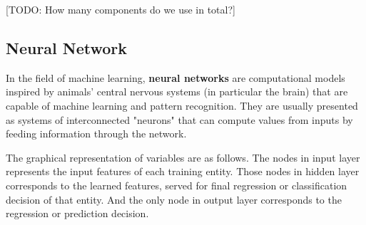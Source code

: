 \documentclass{article} %
\begin{document}
{\large [TODO: How many components do we use in total?]}


\subsection{Neural Network}
In the field of machine learning, {\bf neural networks} are computational models
inspired by animals' central nervous systems (in particular the brain) that
are capable of machine learning and pattern recognition. They are usually
presented as systems of interconnected "neurons" that can compute values from
inputs by feeding information through the network.

The graphical representation of variables are as follows. The nodes in input
layer represents the input features of each training entity. Those nodes in
hidden layer corresponds to the learned features, served for final regression
or classification decision of that entity. And the only node in output layer
corresponds to the regression or prediction decision.


\def\layersep{2.5cm}
\begin{center}
\end{center}
\end{document}
